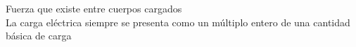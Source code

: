\documentclass[preview]{standalone}
\begin{document}
Fuerza que existe entre cuerpos cargados\\La carga eléctrica siempre se presenta como un múltiplo
entero de una cantidad    básica de carga\\
\end{document}
